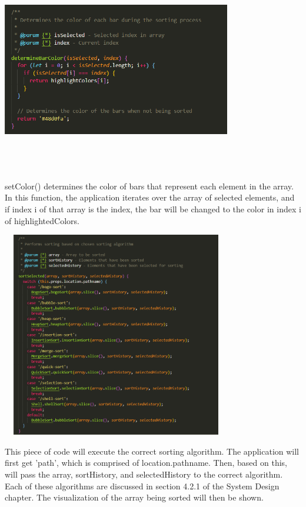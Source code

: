 \begin{center}
    \includegraphics[width=10cm,height=9cm,keepaspectratio]{images/mainpage7}
\end{center}
setColor() determines the color of bars that represent each element in the array. In this function, the application iterates over the array of selected elements, and if index i of that array is the index, the bar will be changed to the color in index i of highlightedColors.

\newpage
\begin{center}
    \includegraphics[width=10cm,height=9cm,keepaspectratio]{images/mainpage6}
\end{center}
This piece of code will execute the correct sorting algorithm. The application will first get 'path', which is comprised of location.pathname. Then, based on this, will pass the array, sortHistory, and selectedHistory to the correct algorithm. Each of these algorithms are discussed in section 4.2.1 of the System Design chapter. The visualization of the array being sorted will then be shown.

